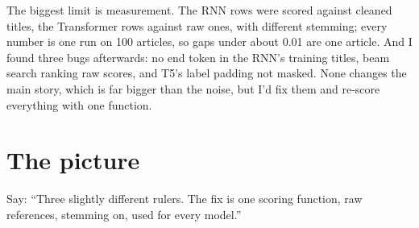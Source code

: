 \begin{sayit}
The biggest limit is measurement. The RNN rows were scored against cleaned titles, the Transformer rows against raw ones, with different stemming; every number is one run on 100 articles, so gaps under about 0.01 are one article. And I found three bugs afterwards: no end token in the RNN's training titles, beam search ranking raw scores, and T5's label padding not masked. None changes the main story, which is far bigger than the noise, but I'd fix them and re-score everything with one function.
\end{sayit}

\section{The picture}

\begin{sayit}
\begin{pic}
\end{pic}
Say: ``Three slightly different rulers. The fix is one scoring function, raw references, stemming on, used for every model.''
\end{sayit}

